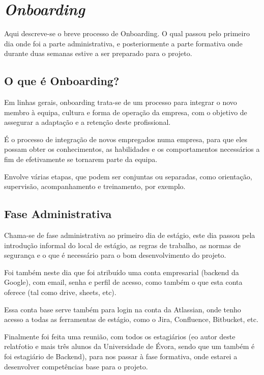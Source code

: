 \chapter{\textit{Onboarding}}\label{cap3}

Aqui descreve-se o breve processo de Onboarding. O qual passou pelo primeiro dia onde foi a parte administrativa, e posteriormente a parte formativa onde durante duas semanas estive a ser preparado para o projeto.

\section{O que é Onboarding?}

Em linhas gerais, onboarding trata-se de um processo para integrar o novo membro à equipa, cultura e forma de operação da empresa, com o objetivo de assegurar a adaptação e a retenção deste profissional.

É o processo de integração de novos empregados numa empresa, para que eles possam obter os conhecimentos, as habilidades e os comportamentos necessários a fim de efetivamente se tornarem parte da equipa.

Envolve várias etapas, que podem ser conjuntas ou separadas, como orientação, supervisão, acompanhamento e treinamento, por exemplo.

\section{Fase Administrativa}

Chama-se de fase administrativa ao primeiro dia de estágio, este dia passou pela introdução informal do local de estágio, as regras de trabalho, as normas de segurança e o que é necessário para o bom desenvolvimento do projeto.

Foi também neste dia que foi atribuído uma conta empresarial (backend da Google), com email, senha e perfil de acesso, como também o que esta conta oferece (tal como drive, sheets, etc).

Essa conta base serve também para login na conta da Atlassian, onde tenho acesso a todas as ferramentas de estágio, como o Jira, Confluence, Bitbucket, etc.

Finalmente foi feita uma reunião, com todos os estagiários (eo autor deste relatŕotio e mais três alunos da Universidade de Évora, sendo que um também é foi estagiário de Backend), para nos passar à fase formativa, onde estarei a desenvolver competências base para o projeto.

